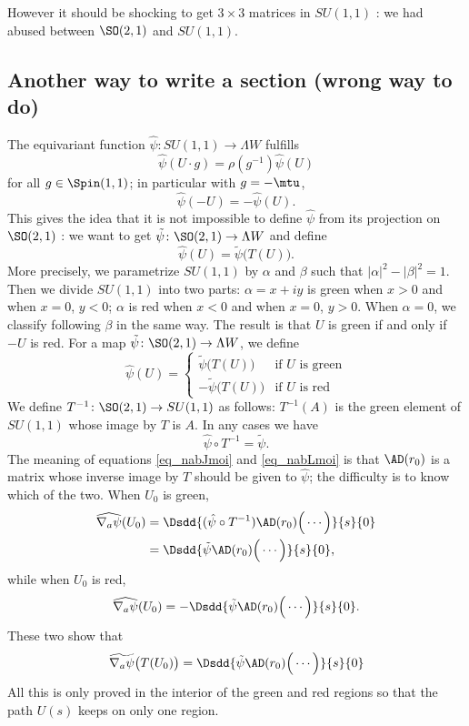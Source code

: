 However it should be shocking to get $3\times 3$ matrices in $SU(1,1)$ : we had abused between $\SO(2,1)$ and $SU(1,1)$.

\subsection{Another way to write a section (wrong way to do)}

The equivariant function $\hat{\psi}\colon SU(1,1)\to \Lambda W$ fulfills 
\[ 
  \hat{\psi}(U\cdot g)=\rho(g^{-1})\hat{\psi}(U)
\]
for all $g\in\Spin(1,1)$; in particular with $g=-\mtu$,
\begin{equation}
 \hat{\psi}(-U)=-\hat{\psi}(U).
\end{equation}
This gives the idea that it is not impossible to define $\hat{\psi}$ from its projection on $\SO(2,1)$ : we want to get $\tilde{\psi}\colon \SO(2,1)\to \Lambda W$ and define 
\[ 
  \hat{\psi}(U)=\tilde{\psi}\big( T(U) \big).
\]
More precisely, we parametrize $SU(1,1)$ by $\alpha$ and $\beta$ such that $| \alpha |^2-| \beta |^2=1$. Then we divide $SU(1,1)$ into two parts: $\alpha=x+iy$ is green when $x>0$ and when $x=0$, $y<0$; $\alpha$ is red when $x<0$ and when $x=0$, $y>0$. When $\alpha=0$, we classify following $\beta$ in the same way. The result is that $U$ is green if and only if $-U$ is red. For a map $\tilde{\psi}\colon \SO(2,1)\to \Lambda W$, we define
\begin{equation}
\hat{\psi}(U)=
\begin{cases}
    \tilde{\psi}\big( T(U) \big)&\text{if }U \text{ is green}\\
    -\tilde{\psi}\big(T(U)\big)&\text{if }U \text{ is red}
\end{cases}
\end{equation}
We define $T^{-1}\colon \SO(2,1)\to SU(1,1)$ as follows: $T^{-1}(A)$ is the green element of $SU(1,1)$ whose image by $T$ is $A$. In any cases we have
\[ 
\hat{\psi}\circ T^{-1}=\tilde{\psi}.  
\]
The meaning of equations \eqref{eq_nabJmoi} and \eqref{eq_nabLmoi} is that $\AD(r_0)$ is a matrix whose inverse image by $T$ should be given to $\hat{\psi}$; the difficulty is to know which of the two. When $U_0$ is green,
\[ 
 \begin{split}
\widehat{\nabla_a\psi}(U_0)&=\Dsdd{ (\hat{\psi}\circ T^{-1})  \AD(r_0)\Big( \cdots \Big)   }{s}{0} \\
        &=\Dsdd{ \tilde{\psi} \AD(r_0)\Big( \cdots \Big)}{s}{0},
\end{split} 
\]
while when $U_0$ is red,
\[ 
  \widehat{\nabla_a\psi}(U_0)=-\Dsdd{ \tilde{\psi}\AD(r_0)\Big( \cdots \Big) }{s}{0}.
\]
These two show that
\begin{equation}
\widetilde{\nabla_a\psi}\big( T(U_0) \big)=\Dsdd{   \tilde{\psi}\AD(r_0)\Big( \cdots \Big)    }{s}{0}
\end{equation}
All this is only proved in the interior of the green and red regions so that the path $U(s)$ keeps on only one region.

